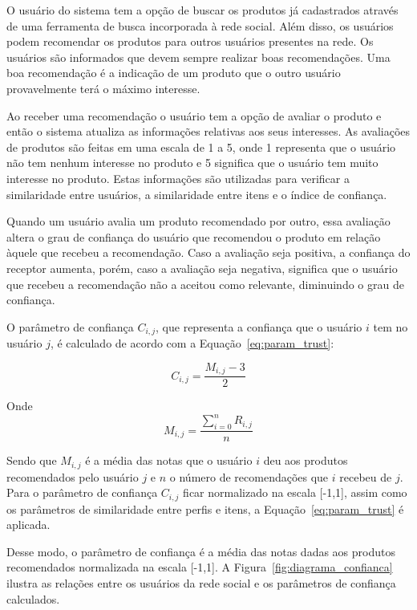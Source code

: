   O usuário do sistema tem a opção de buscar os produtos já cadastrados através de uma ferramenta de busca incorporada à rede social. Além disso, os usuários podem recomendar os produtos para outros usuários presentes na rede. Os usuários são informados que devem sempre realizar boas recomendações. Uma boa recomendação é a indicação de um produto que o outro usuário provavelmente terá o máximo interesse.

 Ao receber uma recomendação o usuário tem a opção de avaliar o produto e então o sistema atualiza as informações relativas aos seus interesses. As avaliações de produtos são feitas em uma escala de 1 a 5, onde 1 representa que o usuário não tem nenhum interesse no produto e 5 significa que o usuário tem muito interesse no produto. Estas informações são utilizadas para verificar a similaridade entre usuários, a similaridade entre itens e o índice de confiança.
 
 Quando um usuário avalia um produto recomendado por outro, essa avaliação altera o grau de confiança do usuário que recomendou o produto em relação àquele que recebeu a recomendação. Caso a avaliação seja positiva, a confiança do receptor aumenta, porém, caso a avaliação seja negativa, significa que o usuário que recebeu a recomendação não a aceitou como relevante, diminuindo o grau de confiança.

 O parâmetro de confiança $C_{i,j}$, que representa a confiança que o usuário $i$ tem no usuário $j$, é calculado de acordo com a Equação~\ref{eq:param_trust}:
 
\begin{equation}
 C_{i,j} = \frac{M_{i,j} - 3}{2}
 \label{eq:param_trust} 
\end{equation}

 Onde
\begin{equation}
 M_{i,j} = \frac{{\sum_{i=0}^n}R_{i,j}}{n}
 \label{eq:media_notas}
\end{equation}

 Sendo que $M_{i,j}$ é a média das notas que o usuário $i$ deu aos produtos recomendados pelo usuário $j$ e $n$ o número de recomendações que $i$ recebeu de $j$. Para o parâmetro de confiança $C_{i,j}$ ficar normalizado na escala [-1,1], assim como os parâmetros de similaridade entre perfis e itens, a Equação~\ref{eq:param_trust} é aplicada.

 Desse modo, o parâmetro de confiança é a média das notas dadas aos produtos recomendados normalizada na escala [-1,1]. A Figura~\ref{fig:diagrama_confianca} ilustra as relações entre os usuários da rede social e os parâmetros de confiança calculados.
 
